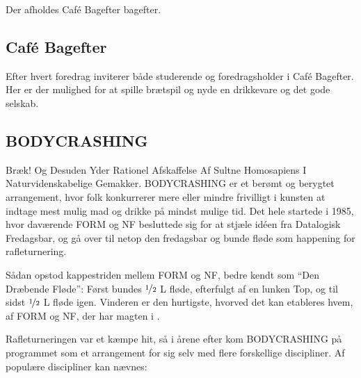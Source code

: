 \noindent Der afholdes Café Bagefter bagefter.

\subsection{Café Bagefter}
Efter hvert foredrag inviterer \TKET både studerende og foredragsholder i Café Bagefter. Her er der mulighed for at spille brætspil og nyde en drikkevare og det gode selskab.

\subsection{BODYCRASHING}
Bræk! Og Desuden Yder \CERM Rationel Afskaffelse Af Sultne Homosapiens I Naturvidenskabelige Gemakker. BODYCRASHING er et berømt og berygtet arrangement, hvor folk konkurrerer mere eller mindre frivilligt i kunsten at indtage mest mulig mad og drikke på mindst mulige tid. Det hele startede i 1985, hvor daværende FORM og NF besluttede sig for at stjæle idéen fra Datalogisk Fredagsbar, og gå over til netop den fredagsbar og bunde fløde som happening for \TKETs rafleturnering.

Sådan opstod kappestriden mellem FORM og NF, bedre kendt som ``Den Dræbende Fløde'': Først bundes $\nicefrac{1}{2}$ L fløde, efterfulgt af en lunken Top, og til sidst $\nicefrac{1}{2}$ L fløde igen. Vinderen er den hurtigste, hvorved det kan etableres hvem, af FORM og NF, der har magten i \TKET.

Rafleturneringen var et kæmpe hit, så i årene efter kom BODYCRASHING på programmet som et arrangement for sig selv med flere forskellige discipliner. %
Af populære discipliner kan nævnes:

